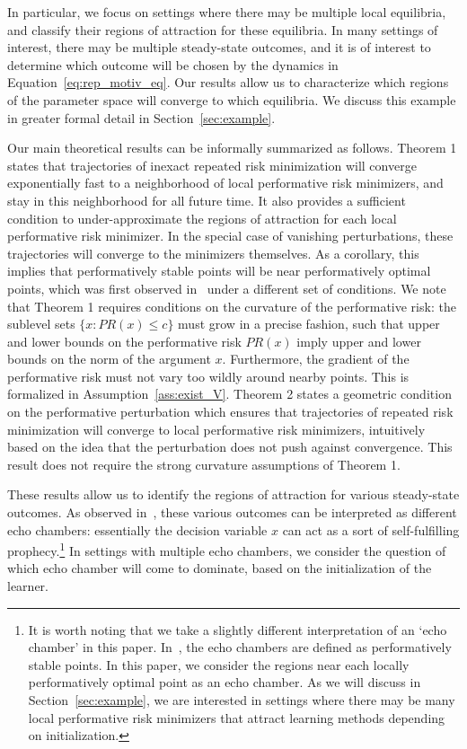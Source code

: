 In particular, we focus on settings where there may be multiple local equilibria, and classify their regions of attraction for these equilibria. In many settings of interest, there may be multiple steady-state outcomes, and it is of interest to determine which outcome will be chosen by the dynamics in Equation~\eqref{eq:rep_motiv_eq}. Our results allow us to characterize which regions of the parameter space will converge to which equilibria. 
We discuss this example in greater formal detail in Section~\ref{sec:example}.

Our main theoretical results can be informally summarized as follows. Theorem 1 states that trajectories of inexact repeated risk minimization will converge exponentially fast to a neighborhood of local performative risk minimizers, and stay in this neighborhood for all future time. It also provides a sufficient condition to under-approximate the regions of attraction for each local performative risk minimizer. In the special case of vanishing perturbations, these trajectories will converge to the minimizers themselves. As a corollary, this implies that performatively stable points will be near performatively optimal points, which was first observed in~\citet{Perdomo:2020tz} under a different set of conditions. 
We note that Theorem 1 requires conditions on the curvature of the performative risk: the sublevel sets $\{ x : PR(x) \le c \}$ must grow in a precise fashion, such that upper and lower bounds on the performative risk $PR(x)$ imply upper and lower bounds on the norm of the argument $x$.
Furthermore, the gradient of the performative risk must not vary too wildly around nearby points. This is formalized in Assumption~\ref{ass:exist_V}. 
Theorem 2 states a geometric condition on the performative perturbation which ensures that trajectories of repeated risk minimization will converge to local performative risk minimizers, intuitively based on the idea that the perturbation does not push against convergence. This result does not require the strong curvature assumptions of Theorem 1.

These results allow us to identify the regions of attraction for various steady-state outcomes. As observed in~\citet{Miller:2021te}, these various outcomes can be interpreted as different echo chambers: essentially the decision variable $x$ can act as a sort of self-fulfilling prophecy.\footnote{It is worth noting that we take a slightly different interpretation of an `echo chamber' in this paper. In~\citet{Miller:2021te}, the echo chambers are defined as performatively stable points. In this paper, we consider the regions near each locally performatively optimal point as an echo chamber. As we will discuss in Section~\ref{sec:example}, we are interested in settings where there may be many local performative risk minimizers that attract learning methods depending on initialization.} In settings with multiple echo chambers, we consider the question of which echo chamber will come to dominate, based on the initialization of the learner. 


